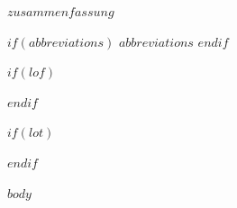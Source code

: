 \documentclass[a4paper,12pt]{article}
\begin{document}
\newpage
$zusammenfassung$

$if(abbreviations)$
\newpage
$abbreviations$
$endif$

$if(lof)$
\newpage
\listoffigures
{}
$endif$

$if(lot)$
\newpage
\listoftables
{}
$endif$

\newpage
\pagestyle{plain}
\setcounter{page}{1}    		%

$body$

\end{document}
